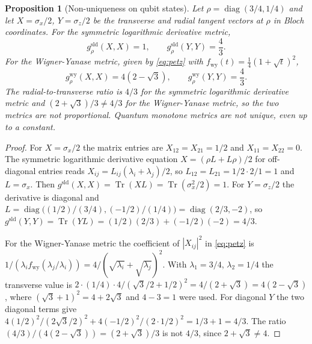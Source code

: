 \documentclass[11pt,letterpaper]{article}
\newtheorem{proposition}[theorem]{Proposition}
\theoremstyle{definition}
\theoremstyle{remark}
\begin{document}
\begin{proposition}[Non-uniqueness on qubit states]
\label{prop:nonunique}
Let $\rho = \operatorname{diag}(3/4, 1/4)$ and let $X = \sigma_x / 2$, $Y = \sigma_z / 2$ be the transverse and radial tangent vectors at $\rho$ in Bloch coordinates. For the symmetric logarithmic derivative metric,
\begin{equation}
g^{\mathrm{sld}}_{\rho}(X, X) = 1, \qquad g^{\mathrm{sld}}_{\rho}(Y, Y) = \frac{4}{3}.
\end{equation}
For the Wigner-Yanase metric, given by \eqref{eq:petz} with $f_{\mathrm{wy}}(t) = \tfrac{1}{4}(1 + \sqrt{t})^2$,
\begin{equation}
g^{\mathrm{wy}}_{\rho}(X, X) = 4(2 - \sqrt{3}), \qquad g^{\mathrm{wy}}_{\rho}(Y, Y) = \frac{4}{3}.
\end{equation}
The radial-to-transverse ratio is $4/3$ for the symmetric logarithmic derivative metric and $(2 + \sqrt{3})/3 \neq 4/3$ for the Wigner-Yanase metric, so the two metrics are not proportional. Quantum monotone metrics are not unique, even up to a constant.
\end{proposition}

\begin{proof}
For $X = \sigma_x / 2$ the matrix entries are $X_{12} = X_{21} = 1/2$ and $X_{11} = X_{22} = 0$. The symmetric logarithmic derivative equation $X = (\rho L + L \rho)/2$ for off-diagonal entries reads $X_{ij} = L_{ij}(\lambda_i + \lambda_j)/2$, so $L_{12} = L_{21} = 1/2 \cdot 2 / 1 = 1$ and $L = \sigma_x$. Then $g^{\mathrm{sld}}(X, X) = \operatorname{Tr}(X L) = \operatorname{Tr}(\sigma_x^2 / 2) = 1$. For $Y = \sigma_z / 2$ the derivative is diagonal and $L = \operatorname{diag}\bigl((1/2)/(3/4), (-1/2)/(1/4)\bigr) = \operatorname{diag}(2/3, -2)$, so $g^{\mathrm{sld}}(Y, Y) = \operatorname{Tr}(Y L) = (1/2)(2/3) + (-1/2)(-2) = 4/3$.

For the Wigner-Yanase metric the coefficient of $|X_{ij}|^2$ in \eqref{eq:petz} is $1/(\lambda_i f_{\mathrm{wy}}(\lambda_j/\lambda_i)) = 4/(\sqrt{\lambda_i} + \sqrt{\lambda_j})^2$. With $\lambda_1 = 3/4$, $\lambda_2 = 1/4$ the transverse value is $2 \cdot (1/4) \cdot 4 / (\sqrt{3}/2 + 1/2)^2 = 4 / (2 + \sqrt{3}) = 4(2 - \sqrt{3})$, where $(\sqrt{3}+1)^2 = 4 + 2\sqrt{3}$ and $4 - 3 = 1$ were used. For diagonal $Y$ the two diagonal terms give $4(1/2)^2 / (2\sqrt{3}/2)^2 + 4(-1/2)^2 / (2 \cdot 1/2)^2 = 1/3 + 1 = 4/3$. The ratio $(4/3)/(4(2-\sqrt{3})) = (2+\sqrt{3})/3$ is not $4/3$, since $2 + \sqrt{3} \neq 4$.
\end{proof}
\end{document}
